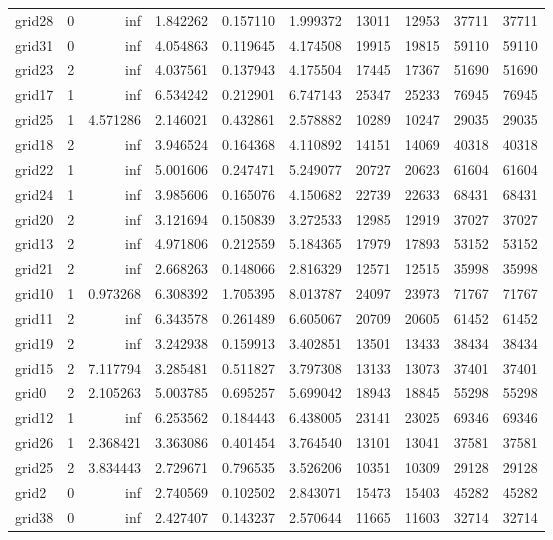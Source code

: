 \begin{longtable}{|l|r|r|r|r|r|r|r|r|r|}
grid28 & 0 & inf & 1.842262 & 0.157110 & 1.999372 & 13011 & 12953 & 37711 & 37711 \\
grid31 & 0 & inf & 4.054863 & 0.119645 & 4.174508 & 19915 & 19815 & 59110 & 59110 \\
grid23 & 2 & inf & 4.037561 & 0.137943 & 4.175504 & 17445 & 17367 & 51690 & 51690 \\
grid17 & 1 & inf & 6.534242 & 0.212901 & 6.747143 & 25347 & 25233 & 76945 & 76945 \\
grid25 & 1 & 4.571286 & 2.146021 & 0.432861 & 2.578882 & 10289 & 10247 & 29035 & 29035 \\
grid18 & 2 & inf & 3.946524 & 0.164368 & 4.110892 & 14151 & 14069 & 40318 & 40318 \\
grid22 & 1 & inf & 5.001606 & 0.247471 & 5.249077 & 20727 & 20623 & 61604 & 61604 \\
grid24 & 1 & inf & 3.985606 & 0.165076 & 4.150682 & 22739 & 22633 & 68431 & 68431 \\
grid20 & 2 & inf & 3.121694 & 0.150839 & 3.272533 & 12985 & 12919 & 37027 & 37027 \\
grid13 & 2 & inf & 4.971806 & 0.212559 & 5.184365 & 17979 & 17893 & 53152 & 53152 \\
grid21 & 2 & inf & 2.668263 & 0.148066 & 2.816329 & 12571 & 12515 & 35998 & 35998 \\
grid10 & 1 & 0.973268 & 6.308392 & 1.705395 & 8.013787 & 24097 & 23973 & 71767 & 71767 \\
grid11 & 2 & inf & 6.343578 & 0.261489 & 6.605067 & 20709 & 20605 & 61452 & 61452 \\
grid19 & 2 & inf & 3.242938 & 0.159913 & 3.402851 & 13501 & 13433 & 38434 & 38434 \\
grid15 & 2 & 7.117794 & 3.285481 & 0.511827 & 3.797308 & 13133 & 13073 & 37401 & 37401 \\
grid0 & 2 & 2.105263 & 5.003785 & 0.695257 & 5.699042 & 18943 & 18845 & 55298 & 55298 \\
grid12 & 1 & inf & 6.253562 & 0.184443 & 6.438005 & 23141 & 23025 & 69346 & 69346 \\
grid26 & 1 & 2.368421 & 3.363086 & 0.401454 & 3.764540 & 13101 & 13041 & 37581 & 37581 \\
grid25 & 2 & 3.834443 & 2.729671 & 0.796535 & 3.526206 & 10351 & 10309 & 29128 & 29128 \\
grid2 & 0 & inf & 2.740569 & 0.102502 & 2.843071 & 15473 & 15403 & 45282 & 45282 \\
grid38 & 0 & inf & 2.427407 & 0.143237 & 2.570644 & 11665 & 11603 & 32714 & 32714 \\

\end{longtable}
